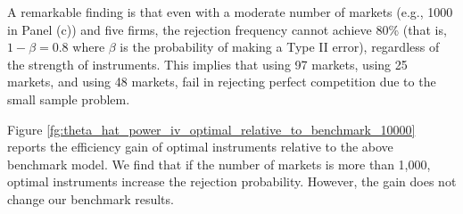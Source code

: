 \documentclass[11pt, a4paper]{article}
\begin{document}
A remarkable finding is that even with a moderate number of markets (e.g., 1000 in Panel (c)) and five firms, the rejection frequency cannot achieve 80\% (that is, $1-\beta=0.8$ where $\beta$ is the probability of making a Type II error), regardless of the strength of instruments.
This implies that \cite{genesove1998testing} using 97 markets, \cite{shaffer1993test} using 25 markets, and \cite{steen1999testing} using 48 markets, fail in rejecting perfect competition due to the small sample problem.

Figure \ref{fg:theta_hat_power_iv_optimal_relative_to_benchmark_10000} reports the efficiency gain of optimal instruments relative to the above benchmark model. 
We find that if the number of markets is more than 1,000, optimal instruments increase the rejection probability. 
However, the gain does not change our benchmark results.
\end{document}
